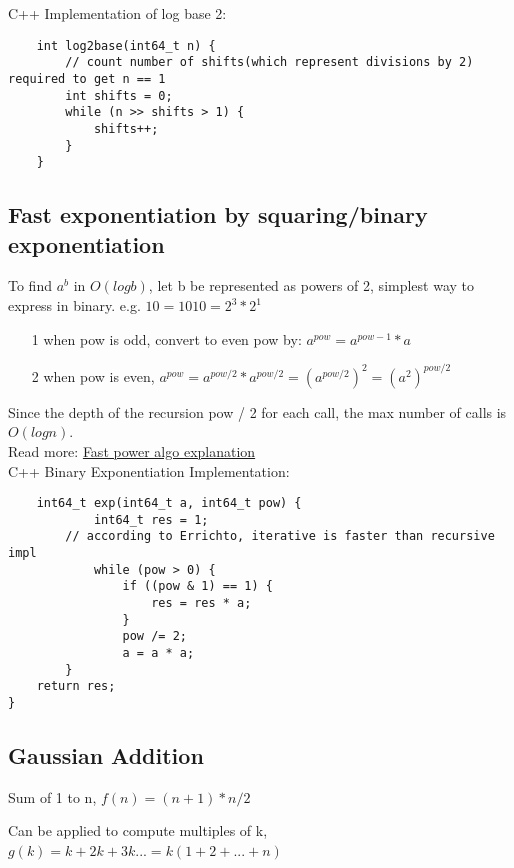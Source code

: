 \documentclass[12pt]{article}
\begin{document}
\noindent C++ Implementation of log base 2: 
\begin{verbatim}
	int log2base(int64_t n) {
		// count number of shifts(which represent divisions by 2) required to get n == 1
		int shifts = 0; 
		while (n >> shifts > 1) {
			shifts++; 
		}
	}  
\end{verbatim} 

\subsection{Fast exponentiation by squaring/binary exponentiation}

To find \(a^b\) in \(O(logb)\),  let b be represented as powers of 2, simplest way to express in binary. 
e.g. \(10 = 1010 = 2^3 * 2^1\)

\begin{itemize}
	\item[1] when pow is odd, convert to even pow by: \(a^{pow} = a^{pow - 1} * a\)
	\item[2] when pow is even, \(a^{pow} = a^{pow / 2} * a^{pow / 2} = (a^{pow / 2})^2 = (a^2)^{pow / 2}\)
\end{itemize} 

Since the depth of the recursion pow / 2 for each call, the max number of calls is \(O(log n)\). \\ [\baselineskip]

\noindent Read more: \href{https://www.rookieslab.com/posts/fast-power-algorithm-exponentiation-by-squaring-cpp-python-implementation}{Fast power algo explanation} \\ [\baselineskip]

\noindent C++ Binary Exponentiation Implementation:
\begin{verbatim}
	int64_t exp(int64_t a, int64_t pow) {
    		int64_t res = 1; 
		// according to Errichto, iterative is faster than recursive impl
    		while (pow > 0) {
        		if ((pow & 1) == 1) {
            		res = res * a; 
        		} 
        		pow /= 2; 
        		a = a * a; 
    	}
    return res; 
} 
\end{verbatim} 

\subsection{Gaussian Addition} 
Sum of 1 to n, \( f(n) = (n + 1) * n / 2 \)

\noindent Can be applied to compute multiples of k, \( g(k) = k + 2k + 3k ... = k(1 + 2 + ... + n) \)\
\end{document}
